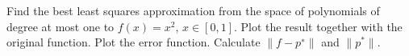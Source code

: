 \begin{problem}
  Find the best least squares approximation from the space of
  polynomials of degree at most one to $f(x) = x^2 ,\, x \in [0, 1]$. Plot
  the result together with the original function. Plot the error
  function. Calculate $\| f - p^∗ \|$ and $\| p^*\|$.
\end{problem}


\begin{solution}

\end{solution}

